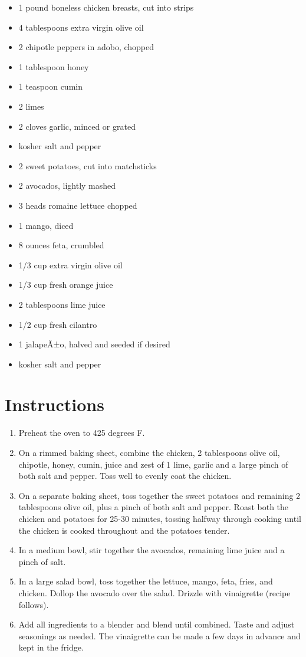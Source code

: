 \documentclass[
  letterpaper,
  DIV=11,
  numbers=noendperiod,
  titlepage=false]{scrreprt}
\providecommand{\tightlist}{%
  \setlength{\itemsep}{0pt}\setlength{\parskip}{0pt}}\usepackage{longtable,booktabs,array}
\begin{document}
\begin{itemize}
\tightlist
\item
  1 pound boneless chicken breasts, cut into strips
\item
  4 tablespoons extra virgin olive oil
\item
  2 chipotle peppers in adobo, chopped
\item
  1 tablespoon honey
\item
  1 teaspoon cumin
\item
  2 limes
\item
  2 cloves garlic, minced or grated
\item
  kosher salt and pepper
\item
  2 sweet potatoes, cut into matchsticks
\item
  2 avocados, lightly mashed
\item
  3 heads romaine lettuce chopped
\item
  1 mango, diced
\item
  8 ounces feta, crumbled
\item
  1/3 cup extra virgin olive oil
\item
  1/3 cup fresh orange juice
\item
  2 tablespoons lime juice
\item
  1/2 cup fresh cilantro
\item
  1 jalapeÃ±o, halved and seeded if desired
\item
  kosher salt and pepper
\end{itemize}

\section{Instructions}\label{instructions-17}

\begin{enumerate}
\def\labelenumi{\arabic{enumi}.}
\tightlist
\item
  Preheat the oven to 425 degrees F.
\item
  On a rimmed baking sheet, combine the chicken, 2 tablespoons olive
  oil, chipotle, honey, cumin, juice and zest of 1 lime, garlic and a
  large pinch of both salt and pepper. Toss well to evenly coat the
  chicken.
\item
  On a separate baking sheet, toss together the sweet potatoes and
  remaining 2 tablespoons olive oil, plus a pinch of both salt and
  pepper. Roast both the chicken and potatoes for 25-30 minutes, tossing
  halfway through cooking until the chicken is cooked throughout and the
  potatoes tender.
\item
  In a medium bowl, stir together the avocados, remaining lime juice and
  a pinch of salt.
\item
  In a large salad bowl, toss together the lettuce, mango, feta, fries,
  and chicken. Dollop the avocado over the salad. Drizzle with
  vinaigrette (recipe follows).
\item
  Add all ingredients to a blender and blend until combined. Taste and
  adjust seasonings as needed. The vinaigrette can be made a few days in
  advance and kept in the fridge.
\end{enumerate}
\end{document}
